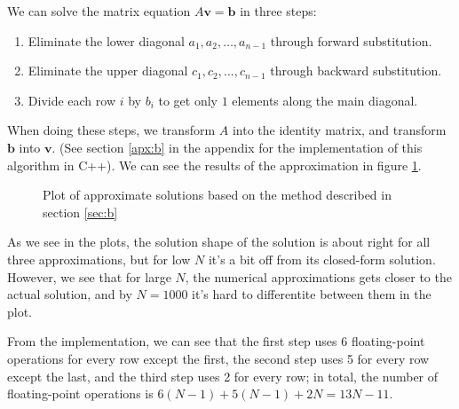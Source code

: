 \documentclass[12pt,a4paper]{article}
\newcommand\V[1]{\mathbf{#1}}                  %
\begin{document}
We can solve the matrix equation $A \V{v} = \V{b}$ in three steps:
\begin{enumerate}
  \item Eliminate the lower diagonal $a_1,a_2,\ldots,a_{n-1}$ through forward substitution.
  \item Eliminate the upper diagonal $c_1,c_2,\ldots,c_{n-1}$ through backward substitution.
  \item Divide each row $i$ by $b_i$ to get only $1$ elements along the main diagonal.
\end{enumerate}
When doing these steps, we transform $A$ into the identity matrix, and transform $\V{b}$ into $\V{v}$. (See section \ref{apx:b} in the appendix for the implementation of this algorithm in C++). We can see the results of the approximation in figure \ref{fig:b1}.

\begin{figure}[!ht]

  \caption{Plot of approximate solutions based on the method described in section \ref{sec:b}} \label{fig:b1}
\end{figure}

As we see in the plots, the solution shape of the solution is about right for all three approximations, but for low $N$ it's a bit off from its closed-form solution. However, we see that for large $N$, the numerical approximations gets closer to the actual solution, and by $N = 1000$ it's hard to differentite between them in the plot.

From the implementation, we can see that the first step uses 6 floating-point operations for every row except the first, the second step uses 5 for every row except the last, and the third step uses 2 for every row; in total, the number of floating-point operations is $6 (N - 1) + 5 (N - 1) + 2 N = 13N - 11$.
\end{document}

